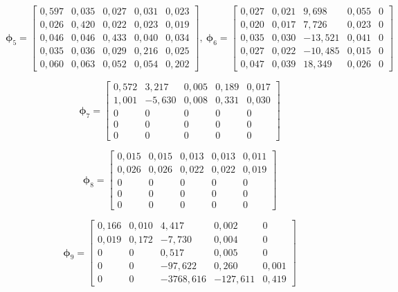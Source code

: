 \[
\boldsymbol{\phi}_{5} = 
\begin{bmatrix}
 0,597 &  0,035 & 0,027 &  0,031 & 0,023 \\
 0,026 &  0,420 & 0,022 &  0,023 & 0,019 \\
 0,046 & 0,046 &  0,433 & 0,040 &  0,034 \\
 0,035 & 0,036 &  0,029 &  0,216 &  0,025 \\
 0,060 &  0,063 & 0,052 &  0,054 &  0,202
\end{bmatrix}, \ 
\boldsymbol{\phi}_{6} = 
\begin{bmatrix}
 0,027 & 0,021 &  9,698 & 0,055 & 0       \\
 0,020 & 0,017 &  7,726 & 0,023 & 0       \\
 0,035 &  0,030 & -13,521 & 0,041 &  0    \\
 0,027 &  0,022 & -10,485 & 0,015 &  0    \\
 0,047 & 0,039 & 18,349 & 0,026 & 0
\end{bmatrix}
\]


\[
\boldsymbol{\phi}_{7} = 
\begin{bmatrix}
    0,572 &  3,217 & 0,005 & 0,189 & 0,017 \\
    1,001 & -5,630 & 0,008 & 0,331 & 0,030 \\
    0 &  0 &  0 &  0 &  0 \\
    0 &  0 &  0 &  0 &  0 \\
    0 &  0 &  0 &  0 &  0
\end{bmatrix}\]

\[ 
\boldsymbol{\phi}_{8} = 
\begin{bmatrix}
 0,015 &  0,015 & 0,013 & 0,013 & 0,011 \\
 0,026 & 0,026 &  0,022 & 0,022 & 0,019 \\
 0 &  0 &  0 &  0 &  0 \\
 0 &  0 &  0 &  0 &  0 \\
 0 &  0 &  0 &  0 &  0 
\end{bmatrix}
\]

\[
\boldsymbol{\phi}_{9} = 
\begin{bmatrix}
 0,166 & 0,010 &  4,417 &  0,002 & 0         \\
 0,019 &  0,172 & -7,730 & 0,004 &  0      \\
 0 &  0 &  0,517 &  0,005 &  0             \\
 0 &  0 & -97,622 & 0,260 &  0,001         \\
 0 &  0 & -3768,616 & -127,611 & 0,419
\end{bmatrix}
\]


